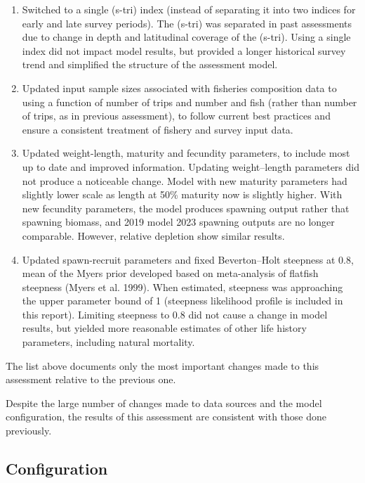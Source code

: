 \documentclass[
]{scrartcl}
\begin{document}
\begin{enumerate}
\item Switched to a single  (\textsf{s-tri}) index (instead of separating it into two indices for early and late survey periods). The  (\textsf{s-tri}) was separated in past assessments due to change in depth and latitudinal coverage of the  (\textsf{s-tri}). Using a single index did not impact model results, but provided a longer historical survey trend and simplified the structure of the assessment model.

\item Updated input sample sizes associated with fisheries composition data to using a function of number of trips and number and fish (rather than number of trips, as in previous assessment), to follow current best practices and ensure a consistent treatment of fishery and survey input data.

\item Updated weight-length, maturity and fecundity parameters, to include most up to date and improved information. Updating weight--length parameters did not produce a noticeable change. Model with new maturity parameters had slightly lower scale as length at 50\% maturity now is slightly higher. With new fecundity parameters, the model produces spawning output rather that spawning biomass, and 2019 model 2023 spawning outputs are no longer comparable. However, relative depletion show similar results.

\item Updated spawn-recruit parameters and fixed Beverton--Holt steepness at 0.8, mean of the Myers prior developed based on meta-analysis of flatfish steepness (Myers et al. 1999). When estimated, steepness was approaching the upper parameter bound of 1 (steepness likelihood profile is included in this report). Limiting steepness to 0.8 did not cause a change in model results, but yielded more reasonable estimates of other life history parameters, including natural mortality.

\end{enumerate}

The list above documents only the most important changes made to this
assessment relative to the previous one.

Despite the large number of changes made to data sources and the model
configuration, the results of this assessment are consistent with those
done previously.

\subsection{Configuration}\label{sec-configuration}
\end{document}
